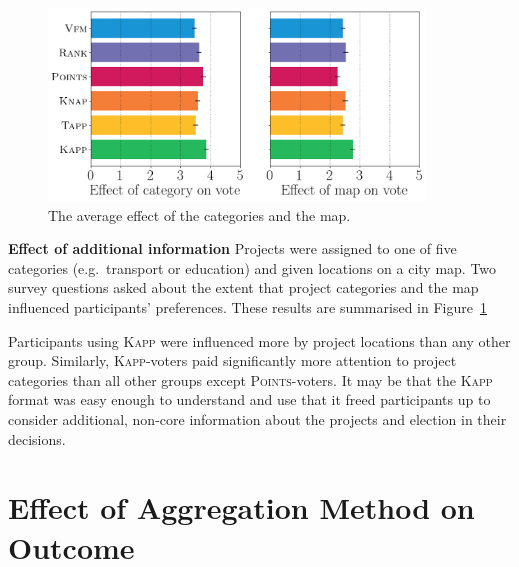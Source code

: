 \documentclass[runningheads]{llncs}
\newcommand{\points}{\textsc{Points}}
\newcommand{\kapp}{\textsc{Kapp}}
\begin{document}
\begin{figure}[!h]
\begin{center}
\includegraphics[width=10cm]{experiment/survey2.png}
\caption{The average effect of the categories and the map.
}\label{fig:cat_map}
\end{center}
\end{figure}


\textbf{Effect of additional information}
Projects were assigned to one of five categories (e.g.\ transport or education) and given locations on a city map. Two survey questions asked about the extent that project categories and the map influenced participants' preferences. These results are summarised in Figure~\ref{fig:cat_map}

Participants using \kapp{} were influenced  more by project locations than any other group. Similarly, \kapp-voters paid significantly more attention to project categories than all other groups except \points-voters. 
It may be that the \kapp{} format was easy enough to understand and use that it freed participants up to consider additional, non-core information about the projects and   election in their decisions. 



\section{  Effect of Aggregation Method on  Outcome}  
\end{document}

